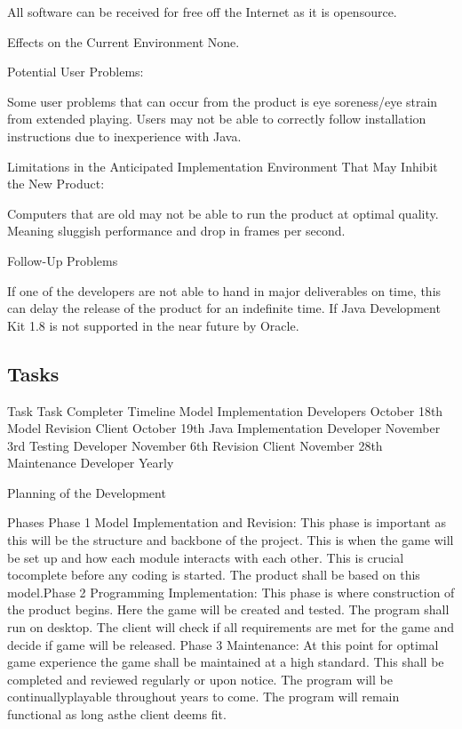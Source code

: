 \documentclass[12pt, titlepage]{article}
\begin{document}
All software can be received for free off the Internet as it is opensource.

Effects on the Current Environment 
None.

Potential User Problems:

Some user problems that can occur from the product is eye soreness/eye strain
from extended playing. Users may not be able to correctly follow installation
instructions due to inexperience with Java.

Limitations in the Anticipated Implementation Environment That May Inhibit the
New Product:

Computers that are old may not be able to run the product at optimal quality.
Meaning sluggish performance and drop in frames per second.

Follow-Up Problems 

If one of the developers are not able to hand in major deliverables on time,
this can delay the release of the product for an indefinite time. If Java
Development Kit 1.8 is not supported in the near future by Oracle.

\subsection{Tasks}

Task
Task Completer 
Timeline
Model Implementation
Developers
October 18th
Model Revision
Client
October 19th
Java Implementation
Developer
November 3rd
Testing
Developer
November 6th
Revision
Client
November 28th
Maintenance
Developer
Yearly

Planning of the Development 

Phases Phase 1 Model Implementation and Revision: This phase is important as
this will be the structure and backbone of the project. This is when the game
will be set up and how each module interacts with each other. This is crucial
tocomplete before any coding is started. The product shall be based on this
model.Phase 2 Programming Implementation: This phase is where construction of
the
product begins. Here the game will be created and tested. The program shall run
on desktop. The client will check if all requirements are met for the game and
decide if game will be released. Phase 3 Maintenance: At this point for optimal
game experience the game shall be maintained at a high standard. This shall be
completed and reviewed regularly or upon notice. The program will be
continuallyplayable throughout years to come. The program will remain functional
as long asthe client deems fit.
\end{document}
